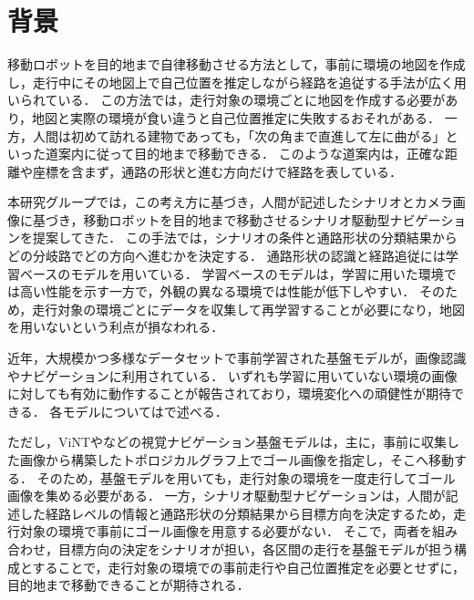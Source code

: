 \section{背景}
\label{sec:background}

移動ロボットを目的地まで自律移動させる方法として，事前に環境の地図を作成し，走行中にその地図上で自己位置を推定しながら経路を追従する手法が広く用いられている．
この方法では，走行対象の環境ごとに地図を作成する必要があり，地図と実際の環境が食い違うと自己位置推定に失敗するおそれがある．
一方，人間は初めて訪れる建物であっても，「次の角まで直進して左に曲がる」といった道案内に従って目的地まで移動できる．
このような道案内は，正確な距離や座標を含まず，通路の形状と進む方向だけで経路を表している．

本研究グループでは，この考え方に基づき，人間が記述したシナリオとカメラ画像に基づき，移動ロボットを目的地まで移動させるシナリオ駆動型ナビゲーションを提案してきた\cite{scenario_si2023}．
この手法では，シナリオの条件と通路形状の分類結果からどの分岐路でどの方向へ進むかを決定する．
通路形状の認識と経路追従には学習ベースのモデルを用いている．
学習ベースのモデルは，学習に用いた環境では高い性能を示す一方で，外観の異なる環境では性能が低下しやすい．
そのため，走行対象の環境ごとにデータを収集して再学習することが必要になり，地図を用いないという利点が損なわれる．

近年，大規模かつ多様なデータセットで事前学習された基盤モデルが，画像認識やナビゲーションに利用されている．
いずれも学習に用いていない環境の画像に対しても有効に動作することが報告されており，環境変化への頑健性が期待できる．
各モデルについてはで述べる．

ただし，ViNTや\NoMaD などの視覚ナビゲーション基盤モデルは，主に，事前に収集した画像から構築したトポロジカルグラフ上でゴール画像を指定し，そこへ移動する\cite{vint,nomad}．
そのため，基盤モデルを用いても，走行対象の環境を一度走行してゴール画像を集める必要がある．
一方，シナリオ駆動型ナビゲーションは，人間が記述した経路レベルの情報と通路形状の分類結果から目標方向を決定するため，走行対象の環境で事前にゴール画像を用意する必要がない．
そこで，両者を組み合わせ，目標方向の決定をシナリオが担い，各区間の走行を基盤モデルが担う構成とすることで，走行対象の環境での事前走行や自己位置推定を必要とせずに，目的地まで移動できることが期待される．
